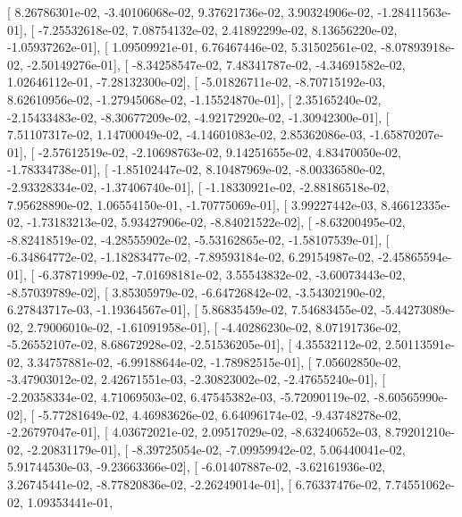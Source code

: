 \documentclass{article}
\begin{document}
       [  8.26786301e-02,  -3.40106068e-02,   9.37621736e-02,
          3.90324906e-02,  -1.28411563e-01],
       [ -7.25532618e-02,   7.08754132e-02,   2.41892299e-02,
          8.13656220e-02,  -1.05937262e-01],
       [  1.09509921e-01,   6.76467446e-02,   5.31502561e-02,
         -8.07893918e-02,  -2.50149276e-01],
       [ -8.34258547e-02,   7.48341787e-02,  -4.34691582e-02,
          1.02646112e-01,  -7.28132300e-02],
       [ -5.01826711e-02,  -8.70715192e-03,   8.62610956e-02,
         -1.27945068e-02,  -1.15524870e-01],
       [  2.35165240e-02,  -2.15433483e-02,  -8.30677209e-02,
         -4.92172920e-02,  -1.30942300e-01],
       [  7.51107317e-02,   1.14700049e-02,  -4.14601083e-02,
          2.85362086e-03,  -1.65870207e-01],
       [ -2.57612519e-02,  -2.10698763e-02,   9.14251655e-02,
          4.83470050e-02,  -1.78334738e-01],
       [ -1.85102447e-02,   8.10487969e-02,  -8.00336580e-02,
         -2.93328334e-02,  -1.37406740e-01],
       [ -1.18330921e-02,  -2.88186518e-02,   7.95628890e-02,
          1.06554150e-01,  -1.70775069e-01],
       [  3.99227442e-03,   8.46612335e-02,  -1.73183213e-02,
          5.93427906e-02,  -8.84021522e-02],
       [ -8.63200495e-02,  -8.82418519e-02,  -4.28555902e-02,
         -5.53162865e-02,  -1.58107539e-01],
       [ -6.34864772e-02,  -1.18283477e-02,  -7.89593184e-02,
          6.29154987e-02,  -2.45865594e-01],
       [ -6.37871999e-02,  -7.01698181e-02,   3.55543832e-02,
         -3.60073443e-02,  -8.57039789e-02],
       [  3.85305979e-02,  -6.64726842e-02,  -3.54302190e-02,
          6.27843717e-03,  -1.19364567e-01],
       [  5.86835459e-02,   7.54683455e-02,  -5.44273089e-02,
          2.79006010e-02,  -1.61091958e-01],
       [ -4.40286230e-02,   8.07191736e-02,  -5.26552107e-02,
          8.68672928e-02,  -2.51536205e-01],
       [  4.35532112e-02,   2.50113591e-02,   3.34757881e-02,
         -6.99188644e-02,  -1.78982515e-01],
       [  7.05602850e-02,  -3.47903012e-02,   2.42671551e-03,
         -2.30823002e-02,  -2.47655240e-01],
       [ -2.20358334e-02,   4.71069503e-02,   6.47545382e-03,
         -5.72090119e-02,  -8.60565990e-02],
       [ -5.77281649e-02,   4.46983626e-02,   6.64096174e-02,
         -9.43748278e-02,  -2.26797047e-01],
       [  4.03672021e-02,   2.09517029e-02,  -8.63240652e-03,
          8.79201210e-02,  -2.20831179e-01],
       [ -8.39725054e-02,  -7.09959942e-02,   5.06440041e-02,
          5.91744530e-03,  -9.23663366e-02],
       [ -6.01407887e-02,  -3.62161936e-02,   3.26745441e-02,
         -8.77820836e-02,  -2.26249014e-01],
       [  6.76337476e-02,   7.74551062e-02,   1.09353441e-01,
\end{document}
